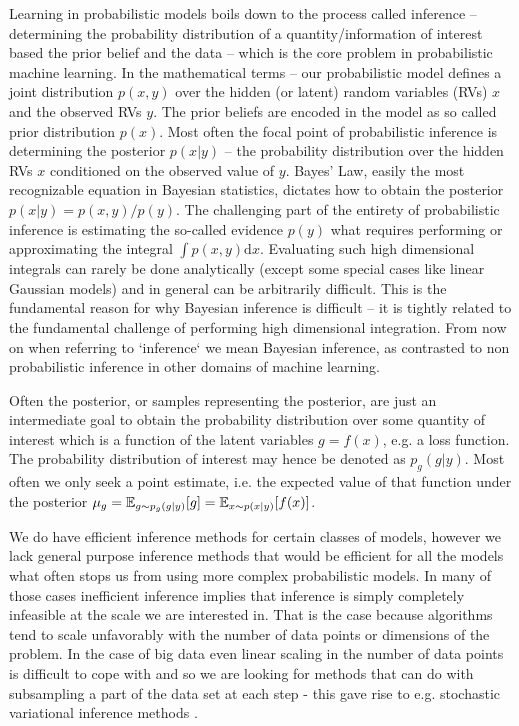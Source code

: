 \documentclass[12pt]{article}
\begin{document}
Learning in probabilistic models boils down to the process called inference -- determining the probability distribution of a quantity/information of interest based the prior belief and the data -- which is the core problem in probabilistic machine learning.
In the mathematical terms -- our probabilistic model defines a joint distribution $p(x,y)$ over the hidden (or latent) random variables (RVs) $x$ and the observed RVs $y$.
The prior beliefs are encoded in the model as so called prior distribution $p(x)$.
Most often the focal point of probabilistic inference is determining the posterior $p(x|y)$ -- the probability distribution over the hidden RVs $x$ conditioned on the observed value of $y$.
Bayes' Law, easily the most recognizable equation in Bayesian statistics, dictates how to obtain the posterior $p(x|y) = p(x,y)/p(y)$.
The challenging part of the entirety of probabilistic inference is estimating the so-called evidence $p(y)$ what requires performing or approximating the integral $\int p(x,y) \text{d}x$.
Evaluating such high dimensional integrals can rarely be done analytically (except some special cases like linear Gaussian models) and in general can be arbitrarily difficult.
This is the fundamental reason for why Bayesian inference is difficult -- it is tightly related to the fundamental challenge of performing high dimensional integration. 
From now on when referring to `inference` we mean Bayesian inference, as contrasted to non probabilistic inference in other domains of machine learning.

Often the posterior, or samples representing the posterior, are just an intermediate goal to
obtain the probability distribution over some quantity of interest which is a function of the latent variables $g=f(x)$, e.g. a loss function.
The probability distribution of interest may hence be denoted as $p_g(g|y)$.
Most often we only seek a point estimate, i.e. the expected value of that function under the posterior $\mu_g=\mathbb{E}_{g \sim p_g(g|y)}[g]=\mathbb{E}_{x \sim p(x|y)}[f(x)]$.

We do have efficient inference methods for certain classes of models, however we lack general purpose inference methods that would be efficient for all the models what often stops us from using more complex probabilistic models.
In many of those cases inefficient inference implies that inference is simply completely infeasible at the scale we are interested in.
That is the case because algorithms tend to scale unfavorably with the number of data points or dimensions of the problem.
In the case of big data even linear scaling in the number of data points is difficult to cope with and so we are looking for methods that can do with subsampling a part of the data set at each step - this gave rise to e.g. stochastic variational inference methods \citep{HoffmanEtAl2013}. 
\end{document}
